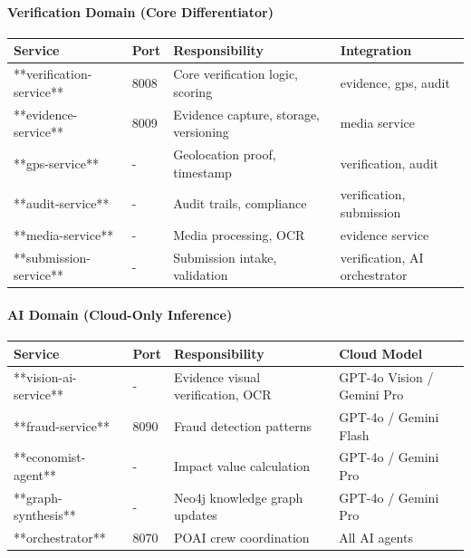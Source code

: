 \documentclass[11pt,a4paper]{article}
\begin{document}
\paragraph{Verification Domain (Core Differentiator)}

\begin{table}[H]
\centering
\begin{tabular}{|l|l|l|l|}
\hline
Service & Port & Responsibility & Integration \\
\hline
**verification-service** & 8008 & Core verification logic, scoring & evidence, gps, audit \\
\hline
**evidence-service** & 8009 & Evidence capture, storage, versioning & media service \\
\hline
**gps-service** & - & Geolocation proof, timestamp & verification, audit \\
\hline
**audit-service** & - & Audit trails, compliance & verification, submission \\
\hline
**media-service** & - & Media processing, OCR & evidence service \\
\hline
**submission-service** & - & Submission intake, validation & verification, AI orchestrator \\
\hline
\end{tabular}
\end{table}

\paragraph{AI Domain (Cloud-Only Inference)}

\begin{table}[H]
\centering
\begin{tabular}{|l|l|l|l|}
\hline
Service & Port & Responsibility & Cloud Model \\
\hline
**vision-ai-service** & - & Evidence visual verification, OCR & GPT-4o Vision / Gemini Pro \\
\hline
**fraud-service** & 8090 & Fraud detection patterns & GPT-4o / Gemini Flash \\
\hline
**economist-agent** & - & Impact value calculation & GPT-4o / Gemini Pro \\
\hline
**graph-synthesis** & - & Neo4j knowledge graph updates & GPT-4o / Gemini Pro \\
\hline
**orchestrator** & 8070 & POAI crew coordination & All AI agents \\
\hline
\end{tabular}
\end{table}
\end{document}

